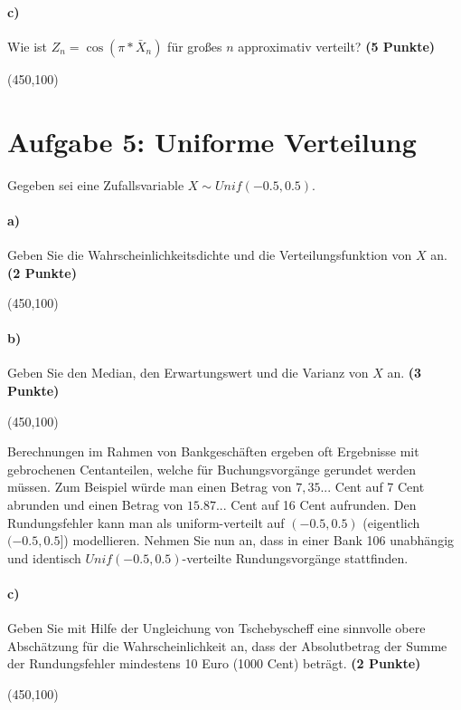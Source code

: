 \documentclass[10pt, a4paper]{article}
\begin{document}
\paragraph{c)} Wie ist $Z_n= \cos(\pi*\bar{X}_n)$ für großes $n$ approximativ verteilt? \textbf{(5 Punkte)}
\begin{center}
  \framebox(450,100){}
\end{center}

\section{Aufgabe 5: Uniforme Verteilung}
Gegeben sei eine Zufallsvariable $X\sim Unif(-0.5,0.5)$.
\paragraph{a)} Geben Sie die Wahrscheinlichkeitsdichte und die Verteilungsfunktion von $X$ an. \textbf{(2 Punkte)}
\begin{center}
  \framebox(450,100){}
\end{center}

\paragraph{b)} Geben Sie den Median, den Erwartungswert und die Varianz von $X$ an. \textbf{(3 Punkte)}
\begin{center}
  \framebox(450,100){}
\end{center}

Berechnungen im Rahmen von Bankgeschäften ergeben oft Ergebnisse mit gebrochenen Centanteilen, welche für Buchungsvorgänge gerundet werden müssen. Zum Beispiel würde man einen Betrag von $7,35...$ Cent auf 7 Cent abrunden und einen Betrag von $15.87...$ Cent auf 16 Cent aufrunden. Den Rundungsfehler kann man als uniform-verteilt auf $(-0.5,0.5)$ (eigentlich $(-0.5,0.5]$) modellieren. Nehmen Sie nun an, dass in einer Bank 106 unabhängig und identisch $Unif(-0.5,0.5)$-verteilte Rundungsvorgänge stattfinden.
\paragraph{c)} Geben Sie mit Hilfe der Ungleichung von Tschebyscheff eine sinnvolle obere Abschätzung für die Wahrscheinlichkeit an, dass der Absolutbetrag der Summe der Rundungsfehler mindestens 10 Euro (1000 Cent) beträgt. \textbf{(2 Punkte)}
\begin{center}
  \framebox(450,100){}
\end{center}
\end{document}

